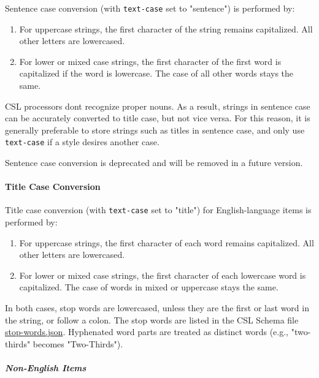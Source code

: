 Sentence case conversion (with \texttt{text-case} set to "sentence") is
performed by:

\begin{enumerate}
\def\labelenumi{\arabic{enumi}.}
\tightlist
\item
  For uppercase strings, the first character of the string remains
  capitalized. All other letters are lowercased.
\item
  For lower or mixed case strings, the first character of the first word
  is capitalized if the word is lowercase. The case of all other words
  stays the same.
\end{enumerate}

CSL processors don\textquotesingle t recognize proper nouns. As a
result, strings in sentence case can be accurately converted to title
case, but not vice versa. For this reason, it is generally preferable to
store strings such as titles in sentence case, and only use
\texttt{text-case} if a style desires another case.

Sentence case conversion is deprecated and will be removed in a future
version.

\hypertarget{title-case-conversion}{%
\paragraph{Title Case Conversion}\label{title-case-conversion}}

Title case conversion (with \texttt{text-case} set to "title") for
English-language items is performed by:

\begin{enumerate}
\def\labelenumi{\arabic{enumi}.}
\tightlist
\item
  For uppercase strings, the first character of each word remains
  capitalized. All other letters are lowercased.
\item
  For lower or mixed case strings, the first character of each lowercase
  word is capitalized. The case of words in mixed or uppercase stays the
  same.
\end{enumerate}

In both cases, stop words are lowercased, unless they are the first or
last word in the string, or follow a colon. The stop words are listed in
the CSL Schema file
\href{https://resource.citationstyles.org/schema/latest/styles/stop-words.json}{stop-words.json}.
Hyphenated word parts are treated as distinct words (e.g., "two-thirds"
becomes "Two-Thirds").

\hypertarget{non-english-items}{%
\subparagraph{Non-English Items}\label{non-english-items}}

